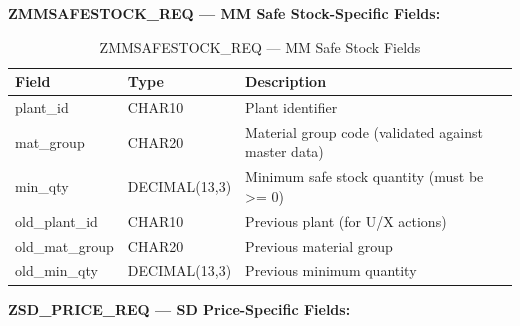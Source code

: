 \documentclass[12pt,a4paper]{report}
\begin{document}
\noindent\textbf{ZMMSAFESTOCK\_REQ --- MM Safe Stock-Specific Fields:}

\begin{table}[H]
\centering\small
\begin{tabularx}{\textwidth}{|l|l|X|}
  \hline
  \rowcolor{tableheadpeach}
  \textbf{Field} & \textbf{Type} & \textbf{Description} \\ \hline
  plant\_id & CHAR10 & Plant identifier \\ \hline
  mat\_group & CHAR20 & Material group code (validated against master data) \\ \hline
  min\_qty & DECIMAL(13,3) & Minimum safe stock quantity (must be >= 0) \\ \hline
  old\_plant\_id & CHAR10 & Previous plant (for U/X actions) \\ \hline
  old\_mat\_group & CHAR20 & Previous material group \\ \hline
  old\_min\_qty & DECIMAL(13,3) & Previous minimum quantity \\ \hline
\end{tabularx}
\caption{ZMMSAFESTOCK\_REQ --- MM Safe Stock Fields}
\label{tab:mmss-fields}
\end{table}

\noindent\textbf{ZSD\_PRICE\_REQ --- SD Price-Specific Fields:}
\end{document}
